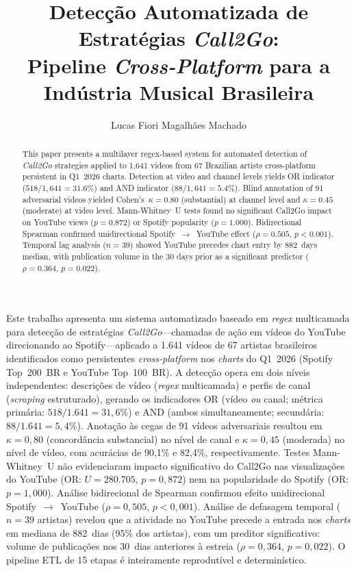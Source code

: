 ﻿\documentclass[12pt]{article}
\title{Detecção Automatizada de Estratégias \textit{Call2Go}:\\
       Pipeline \textit{Cross-Platform} para a Indústria Musical Brasileira}
\author{Lucas Fiori Magalhães Machado\inst{1}}
\begin{document}
\maketitle

\begin{abstract}
This paper presents a multilayer regex-based system for automated detection
of \textit{Call2Go} strategies applied to 1,641 videos from 67 Brazilian
artists cross-platform persistent in Q1~2026 charts. Detection at video and
channel levels yields OR indicator ($518/1{,}641 = 31.6\%$) and AND indicator
($88/1{,}641 = 5.4\%$). Blind annotation of 91 adversarial videos yielded
Cohen's~$\kappa = 0.80$ (substantial) at channel level and $\kappa = 0.45$
(moderate) at video level. Mann-Whitney~U tests found no significant Call2Go
impact on YouTube views ($p=0.872$) or Spotify popularity ($p=1.000$).
Bidirectional Spearman confirmed unidirectional Spotify~$\to$~YouTube effect
($\rho=0.505$, $p<0.001$). Temporal lag analysis ($n=39$) showed YouTube
precedes chart entry by 882~days median, with publication volume in the 30
days prior as a significant predictor ($\rho=0.364$, $p=0.022$).
\end{abstract}

\begin{resumo}
Este trabalho apresenta um sistema automatizado baseado em \textit{regex}
multicamada para detecção de estratégias \textit{Call2Go}---chamadas de ação
em vídeos do YouTube direcionando ao Spotify---aplicado a 1.641 vídeos de 67
artistas brasileiros identificados como persistentes \textit{cross-platform}
nos \textit{charts} do Q1~2026 (Spotify Top~200~BR e YouTube Top~100~BR). A
detecção opera em dois níveis independentes: descrições de vídeo
(\textit{regex} multicamada) e perfis de canal (\textit{scraping} estruturado),
gerando os indicadores OR (vídeo \textit{ou} canal; métrica primária:
$518/1.641 = 31{,}6\%$) e AND (ambos simultaneamente; secundária:
$88/1.641 = 5{,}4\%$). Anotação às cegas de 91 vídeos adversariais resultou
em $\kappa = 0{,}80$ (concordância substancial) no nível de canal e
$\kappa = 0{,}45$ (moderada) no nível de vídeo, com acurácias de 90,1\% e
82,4\%, respectivamente. Testes Mann-Whitney~U não evidenciaram impacto
significativo do Call2Go nas visualizações do YouTube (OR: $U=280.705$,
$p=0{,}872$) nem na popularidade do Spotify (OR: $p=1{,}000$). Análise
bidirecional de Spearman confirmou efeito unidirecional Spotify~$\to$~YouTube
($\rho=0{,}505$, $p<0{,}001$). Análise de defasagem temporal ($n=39$
artistas) revelou que a atividade no YouTube precede a entrada nos
\textit{charts} em mediana de 882~dias (95\% dos artistas), com um preditor
significativo: volume de publicações nos 30~dias anteriores à estreia
($\rho=0{,}364$, $p=0{,}022$). O pipeline ETL de 15 etapas é inteiramente
reprodutível e determinístico.
\end{resumo}
\end{document}

